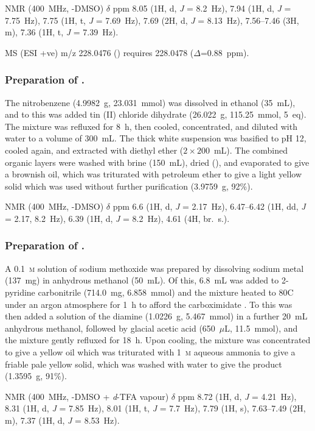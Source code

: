 \begin{refsection}
 NMR (400~MHz, -DMSO) $\delta$ ppm 8.05 (1H, d, \emph{J} = 8.2~Hz), 7.94 (1H, d, \emph{J} = 7.75~Hz), 7.75 (1H, t, \emph{J} = 7.69~Hz), 7.69 (2H, d, \emph{J} = 8.13~Hz), 7.56--7.46 (3H, m), 7.36 (1H, t, \emph{J} = 7.39~Hz).

MS (ESI +ve) m/z 228.0476 ()  requires 228.0478 ($\Delta$=0.88~ppm).

\subsubsection{Preparation of .}
The nitrobenzene (4.9982~g, 23.031~mmol) was dissolved in ethanol (35~mL), and to this was added tin (II) chloride dihydrate (26.022~g, 115.25~mmol, 5~eq).
The mixture was refluxed for 8~h, then cooled, concentrated, and diluted with water to a volume of 300~mL.
The thick white suspension was basified to pH 12, cooled again, and extracted with diethyl ether ($2\times200$~mL).
The combined organic layers were washed with brine (150~mL), dried (), and evaporated to give a brownish oil, which was triturated with petroleum ether to give a light yellow solid which was used without further purification (3.9759~g, 92\%).

 NMR (400~MHz, -DMSO) $\delta$ ppm 6.6 (1H, d, \emph{J} = 2.17~Hz), 6.47--6.42 (1H, dd, \emph{J} = 2.17, 8.2~Hz), 6.39 (1H, d, \emph{J} = 8.2~Hz), 4.61 (4H, br.\ s.).

\subsubsection{Preparation of .}
A 0.1~\textsc{m} solution of sodium methoxide was prepared by dissolving sodium metal (137~mg) in anhydrous methanol (50~mL).
Of this, 6.8~mL was added to 2-pyridine carbonitrile (714.0~mg, 6.858~mmol) and the mixture heated to 80\degree{}C under an argon atmosphere for 1~h to afford the carboximidate .
To this was then added a solution of the diamine  (1.0226~g, 5.467~mmol) in a further 20~mL anhydrous methanol, followed by glacial acetic acid (650~$\mu$L, 11.5~mmol), and the mixture gently refluxed for 18~h.
Upon cooling, the mixture was concentrated to give a yellow oil which was triturated with 1~\textsc{m} aqueous ammonia to give a friable pale yellow solid, which was washed with water to give the product (1.3595~g, 91\%).

 NMR (400~MHz, -DMSO + \textit{d}-TFA vapour) $\delta$ ppm 8.72 (1H, d, \emph{J} = 4.21~Hz), 8.31 (1H, d, \emph{J} = 7.85~Hz), 8.01 (1H, t, \emph{J} = 7.7~Hz), 7.79 (1H, s), 7.63--7.49 (2H, m), 7.37 (1H, d, \emph{J} = 8.53~Hz).


\end{refsection}
